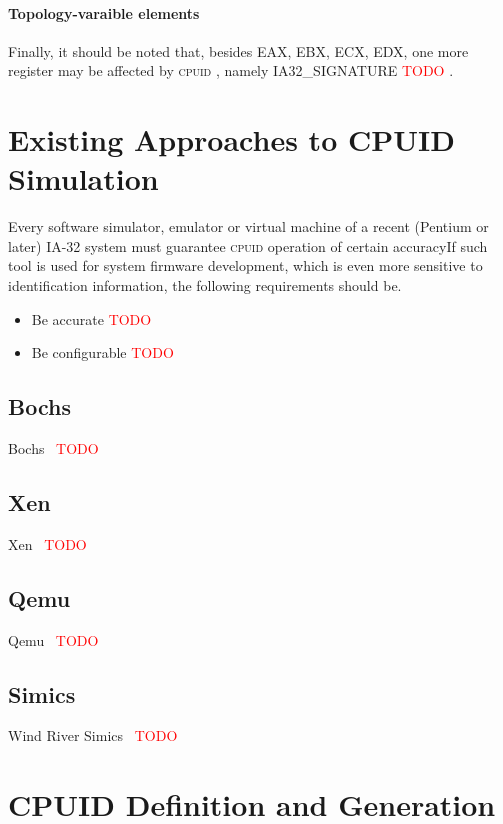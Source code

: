 \documentclass[a4paper,10pt,oneside,unicode]{article}
\newcommand{\cpuid}{\textsc{cpuid} }
\newcommand{\todo}[1][]{\textcolor{red}{TODO #1}}
\begin{document}
\paragraph{Topology-varaible elements}

Finally, it should be noted that, besides EAX, EBX, ECX, EDX, one more register may be affected by \cpuid, namely IA32\_SIGNATURE \todo.

\section{Existing Approaches to CPUID Simulation}\label{sec:approaches}

Every software simulator, emulator or virtual machine of a recent (Pentium or later) IA-32 system must guarantee \cpuid operation of certain accuracyIf such tool is used for system firmware development, which is even more sensitive to identification information, the following requirements should be.
\begin{itemize}
\item Be accurate \todo
\item Be configurable \todo
\end{itemize}

\subsection{Bochs}

Bochs~\cite{bochs} \todo 

\subsection{Xen}

Xen~\cite{xen2006} \todo 

\subsection{Qemu}

Qemu~\cite{qemu} \todo 

\subsection{Simics}

Wind River Simics~\cite{simics} \todo

\section{CPUID Definition and Generation}\label{sec:cpuidgen}
\end{document}
